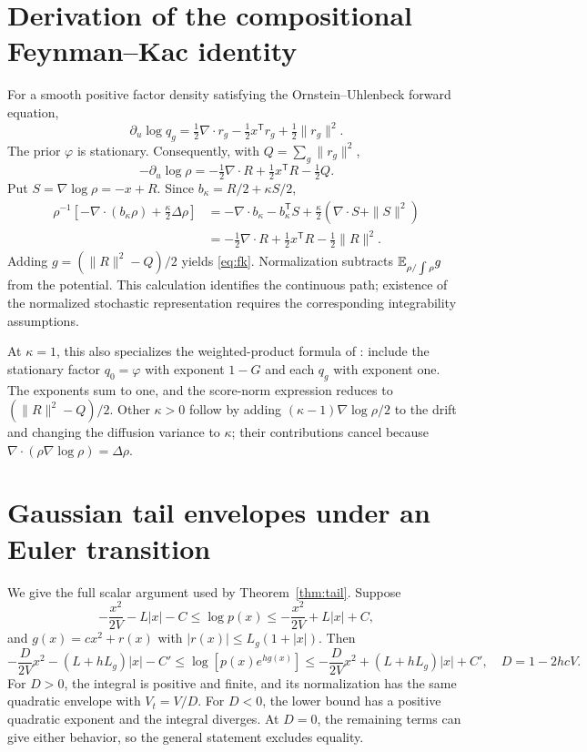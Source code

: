 \section{Derivation of the compositional Feynman--Kac identity}\label{app:flow}
For a smooth positive factor density satisfying the Ornstein--Uhlenbeck forward equation,
\[
 \partial_u\log q_g=\tfrac12\nabla\cdot r_g-\tfrac12x^{\mathsf T}r_g+\tfrac12\|r_g\|^2.
\]
The prior $\varphi$ is stationary. Consequently, with $Q=\sum_g\|r_g\|^2$,
\[
 -\partial_u\log\rho=-\tfrac12\nabla\cdot R+\tfrac12x^{\mathsf T}R-\tfrac12Q.
\]
Put $S=\nabla\log\rho=-x+R$. Since $b_\kappa=R/2+\kappa S/2$,
\begin{align*}
 \rho^{-1}\left[-\nabla\cdot(b_\kappa\rho)+\tfrac\kappa2\Delta\rho\right]
 &=-\nabla\cdot b_\kappa-b_\kappa^{\mathsf T}S
 +\tfrac\kappa2(\nabla\cdot S+\|S\|^2)\\
 &=-\tfrac12\nabla\cdot R+\tfrac12x^{\mathsf T}R-\tfrac12\|R\|^2.
\end{align*}
Adding $g=(\|R\|^2-Q)/2$ yields \eqref{eq:fk}. Normalization subtracts $\mathbb E_{\rho/\int\rho}g$ from the potential. This calculation identifies the continuous path; existence of the normalized stochastic representation requires the corresponding integrability assumptions.

At $\kappa=1$, this also specializes the weighted-product formula of \citet[Proposition D.5]{skreta2025}: include the stationary factor $q_0=\varphi$ with exponent $1-G$ and each $q_g$ with exponent one. The exponents sum to one, and the score-norm expression reduces to $(\|R\|^2-Q)/2$. Other $\kappa>0$ follow by adding $(\kappa-1)\nabla\log\rho/2$ to the drift and changing the diffusion variance to $\kappa$; their contributions cancel because $\nabla\cdot(\rho\nabla\log\rho)=\Delta\rho$.

\section{Gaussian tail envelopes under an Euler transition}\label{app:envelope}
We give the full scalar argument used by Theorem~\ref{thm:tail}. Suppose
\[
 -\frac{x^2}{2V}-L|x|-C\le\log p(x)\le-\frac{x^2}{2V}+L|x|+C,
\]
and $g(x)=cx^2+r(x)$ with $|r(x)|\le L_g(1+|x|)$. Then
\[
 -\frac{D}{2V}x^2-(L+hL_g)|x|-C'
 \le\log[p(x)e^{hg(x)}]\le
 -\frac{D}{2V}x^2+(L+hL_g)|x|+C',\quad D=1-2hcV.
\]
For $D>0$, the integral is positive and finite, and its normalization has the same quadratic envelope with $V_t=V/D$. For $D<0$, the lower bound has a positive quadratic exponent and the integral diverges. At $D=0$, the remaining terms can give either behavior, so the general statement excludes equality.

